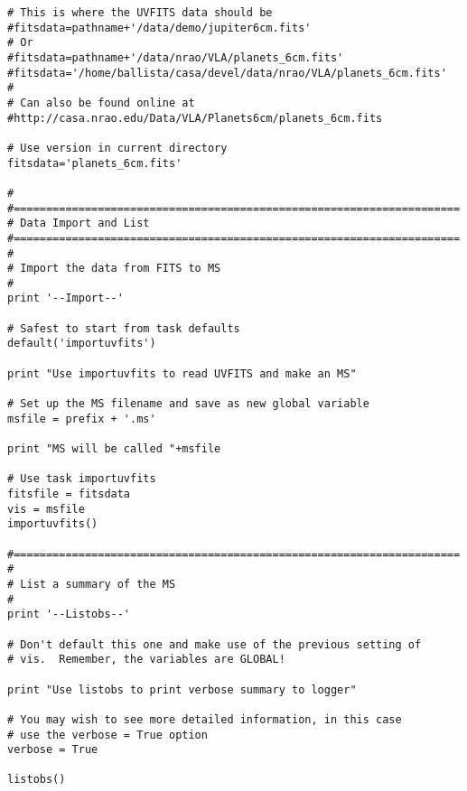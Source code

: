 \begin{verbatim}
# This is where the UVFITS data should be
#fitsdata=pathname+'/data/demo/jupiter6cm.fits'
# Or
#fitsdata=pathname+'/data/nrao/VLA/planets_6cm.fits'
#fitsdata='/home/ballista/casa/devel/data/nrao/VLA/planets_6cm.fits'
#
# Can also be found online at
#http://casa.nrao.edu/Data/VLA/Planets6cm/planets_6cm.fits

# Use version in current directory
fitsdata='planets_6cm.fits'

#
#=====================================================================
# Data Import and List
#=====================================================================
#
# Import the data from FITS to MS
#
print '--Import--'

# Safest to start from task defaults
default('importuvfits')

print "Use importuvfits to read UVFITS and make an MS"

# Set up the MS filename and save as new global variable
msfile = prefix + '.ms'

print "MS will be called "+msfile

# Use task importuvfits
fitsfile = fitsdata
vis = msfile
importuvfits()

#=====================================================================
#
# List a summary of the MS
#
print '--Listobs--'

# Don't default this one and make use of the previous setting of
# vis.  Remember, the variables are GLOBAL!

print "Use listobs to print verbose summary to logger"

# You may wish to see more detailed information, in this case
# use the verbose = True option
verbose = True

listobs()


\end{verbatim}
